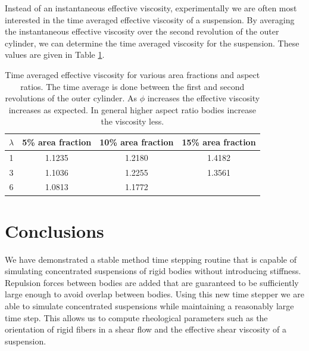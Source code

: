 \documentclass[preprint, 10pt]{elsarticle}
\begin{document}
Instead of an instantaneous effective viscosity, experimentally we are often most interested in the time averaged effective viscosity of a suspension. By averaging the instantaneous effective viscosity over the second revolution of the outer cylinder, we can determine the time averaged viscosity for the suspension. These values are given in Table \ref{tab:viscosity}.
\begin{table}[!h]
\begin{center}
\begin{tabular}{c| c | c |  c}
$\lambda$ & 5\% area fraction  & 10\% area fraction  & 15\% area fraction\\
\hline
1 & 1.1235 & 1.2180 & 1.4182 \\
3 & 1.1036& 1.2255 &  1.3561\\
6 & 1.0813 & 1.1772 & 
\end{tabular}
\end{center}
\caption{Time averaged effective viscosity for various area fractions
and aspect ratios. The time average is done between the first and second
revolutions of the outer cylinder. As $\phi$ increases the effective
viscosity increases as expected. In general higher aspect ratio bodies
increase the viscosity less. }\label{tab:viscosity}
\end{table}




\FloatBarrier
\section{Conclusions\label{s:conclusions}}

We have demonstrated a stable method time stepping routine that is
capable of simulating concentrated suspensions of rigid bodies without
introducing stiffness. Repulsion forces between bodies are added that
are guaranteed to be sufficiently large enough to avoid overlap between
bodies. Using this new time stepper we are able to simulate concentrated suspensions while maintaining a reasonably large time step. This allows us to compute rheological parameters such as the orientation of rigid fibers in a shear flow and the effective shear viscosity of a suspension. 
\end{document}
